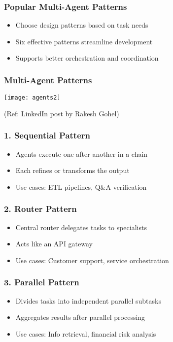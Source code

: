 \begin{frame}[fragile]\frametitle{Popular Multi-Agent Patterns}
    \begin{itemize}
        \item Choose design patterns based on task needs
        \item Six effective patterns streamline development
        \item Supports better orchestration and coordination
    \end{itemize}
\end{frame}

\begin{frame}[fragile]\frametitle{Multi-Agent Patterns}
	
	\begin{center}
	\texttt{[image: agents2]}
	\end{center}
	
{\tiny (Ref: LinkedIn post by Rakesh Gohel)}

\end{frame}


\begin{frame}[fragile]\frametitle{1. Sequential Pattern}
    \begin{itemize}
        \item Agents execute one after another in a chain
        \item Each refines or transforms the output
        \item Use cases: ETL pipelines, Q\&A verification
    \end{itemize}
\end{frame}

\begin{frame}[fragile]\frametitle{2. Router Pattern}
    \begin{itemize}
        \item Central router delegates tasks to specialists
        \item Acts like an API gateway
        \item Use cases: Customer support, service orchestration
    \end{itemize}
\end{frame}

\begin{frame}[fragile]\frametitle{3. Parallel Pattern}
    \begin{itemize}
        \item Divides tasks into independent parallel subtasks
        \item Aggregates results after parallel processing
        \item Use cases: Info retrieval, financial risk analysis
    \end{itemize}
\end{frame}

